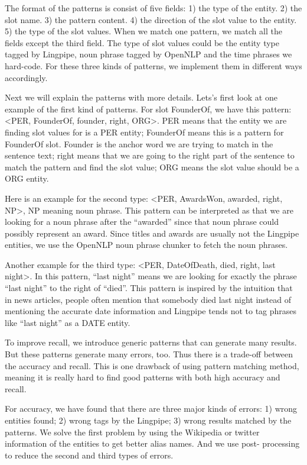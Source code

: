 The format of the patterns is consist of five fields:
1) the type of the entity. 
2) the slot name.
3) the pattern content.
4) the direction of the slot value to the entity.
5) the type of the slot values. When we match one pattern, we match all the 
fields except the third field. The type of slot values could be the entity 
type tagged by Lingpipe, noun phrase tagged by OpenNLP and the time phrases we 
hard-code. For these three kinds of patterns, we implement them in different 
ways accordingly. 

Next we will explain the patterns with more details. Lets’s first look at one 
example of the first kind of patterns. For slot FounderOf, we have this
pattern: \textless PER, FounderOf, founder, right, ORG\textgreater. PER means 
that the entity we are finding slot values for is a PER entity; FounderOf 
means this is a pattern for FounderOf slot. Founder is the anchor word we are 
trying to match in the sentence text; right means that we are going to the 
right part of the sentence to match the pattern and find the slot value; ORG 
means the slot value should be a ORG entity.

Here is an example for the second type: \textless PER, AwardsWon, awarded, 
right, NP\textgreater, NP meaning noun phrase. This pattern can be interpreted 
as that we are looking for a noun phrase after the “awarded'' since that noun 
phrase could possibly represent an award. Since titles and awards are usually 
not the Lingpipe entities, we use the OpenNLP noun phrase chunker to fetch the 
noun phrases.

Another example for the third type: \textless PER, DateOfDeath, died, right, 
last night\textgreater. In this pattern, “last night'' means we are looking for 
exactly the phrase ``last night'' to the right of ``died''. This pattern is 
inspired by the intuition that in news articles, people often mention that 
somebody died last night instead of mentioning the accurate date information 
and Lingpipe tends not to tag phrases like ``last night'' as a DATE entity. 

To improve recall, we introduce generic patterns that can generate many results.
But these patterns generate many errors, too. Thus there is a trade-off 
between the accuracy and recall. This is one drawback of using pattern 
matching method, meaning it is really hard to find good patterns with both 
high accuracy and recall. 

For accuracy, we have found that there are three major kinds of errors: 1) 
wrong entities found; 2) wrong tags by the Lingpipe; 3) wrong results matched 
by the patterns. We solve the first problem by using the Wikipedia or twitter 
information of the entities to get better alias names. And we use
post- processing to reduce the second and third types of errors.

